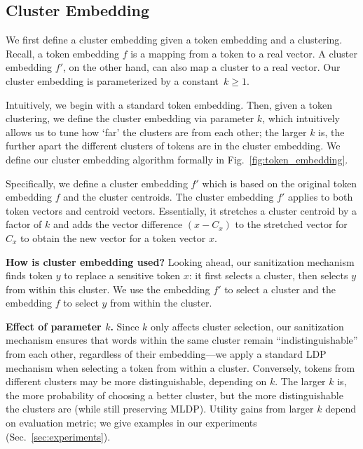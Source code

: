 \subsection{Cluster Embedding}\label{sec:token_embedding}

We first define a cluster embedding given a token embedding and a clustering. Recall, a token embedding $f$ is a mapping from a token to a real vector. A cluster embedding $f'$, on the other hand, can also map  a cluster to a real vector. Our cluster embedding is parameterized by a constant~\( k \geq 1 \).

Intuitively, we begin with a standard token embedding. Then, given a token clustering, we define the cluster embedding via parameter \( k \),  which intuitively allows us to tune how `far' the clusters are from each other; the larger \( k \) is, the further apart the different clusters of tokens are in the cluster embedding. We define our cluster embedding algorithm formally in Fig.~\ref{fig:token_embedding}.

Specifically, we define a cluster embedding \( f' \) which is based on the original token embedding \( f \) and the cluster centroids. The cluster embedding \( f' \) applies to both token vectors and centroid vectors. Essentially, it stretches a cluster centroid by a factor of \( k \) and adds the vector difference \( (x - C_x) \) to the stretched vector for \( C_x \) to obtain the new vector for a token vector \( x \).

\noindent
\textbf{How is cluster embedding used? } %
Looking ahead, our sanitization mechanism finds token \( y \) to replace a sensitive token \( x \): it first selects a cluster, then  selects \( y \) from within this cluster. We use the embedding \( f' \) to select a cluster and the embedding \( f \) to select \( y \) from within the cluster. 

\noindent
\textbf{Effect of parameter $k$. }
Since $k$ only affects cluster selection, our sanitization mechanism ensures that words within the same cluster  remain  ``indistinguishable'' from each other, regardless of their embedding---we apply a standard LDP mechanism when selecting a token from within a cluster. 
Conversely, tokens from different clusters may be more distinguishable, 
depending on \( k \). %
The larger $k$ is, the more probability of choosing a better cluster, but the more distinguishable the clusters are (while still preserving MLDP). Utility gains from larger $k$  depend on evaluation metric; we give examples in our experiments (Sec.~\ref{sec:experiments}). %

